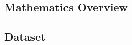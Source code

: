 \documentclass[10pt]{article}
\begin{document}
\subsection{Mathematics Overview}



\subsection{Dataset}
\end{document}
